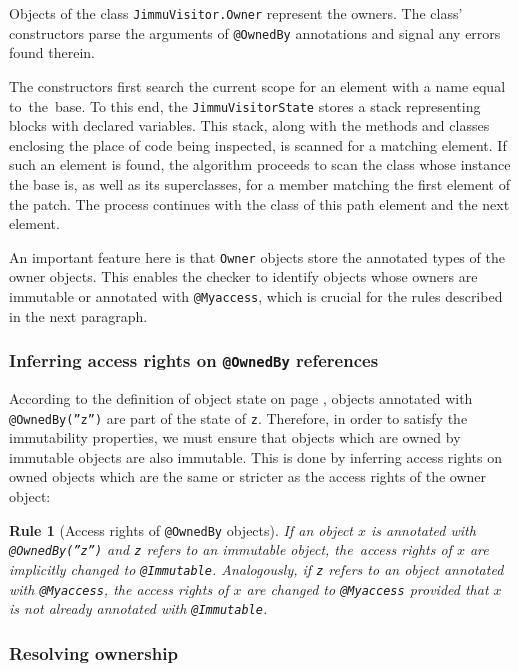 \documentclass{pracamgr}
\theoremstyle{break}
\theoremstyle{break}
\theoremstyle{break}
\newtheorem{verrule}{Rule}
\begin{document}
Objects of the class \texttt{JimmuVisitor.Owner} represent the
owners. The class' constructors parse the arguments of
\texttt{@OwnedBy} annotations and signal any errors found therein.

The constructors first search the current scope for an element with
a name equal to~the~base. To this end, the
\texttt{JimmuVisitorState} stores a stack representing blocks with
declared variables. This stack, along with the methods and classes
enclosing the place of code being inspected, is scanned for a
matching element. If such an element is found, the algorithm proceeds
to scan the class whose instance the base is, as well as its
superclasses, for a member matching the first element of the
patch. The process continues with the class of this path element and
the next element.

An important feature here is that \texttt{Owner} objects store the
annotated types of the owner objects. This enables the checker to
identify objects whose owners are immutable or annotated with
\texttt{@Myaccess}, which is crucial for the rules described in the
next paragraph.

\subsubsection{Inferring access rights on \texttt{@OwnedBy} references} 

According to the definition of object state on page
\pageref{def:state}, objects annotated with \texttt{@OwnedBy(''z'')}
are part of the state of \texttt{z}. Therefore, in order to satisfy
the immutability properties, we must ensure that objects which are
owned by immutable objects are also immutable. This is done by
inferring access rights on owned objects which are the same or
stricter as the access rights of the owner object:

\begin{verrule}[Access rights of \texttt{@OwnedBy} objects]
  If an object $x$ is annotated with \texttt{@OwnedBy(''z'')} and
  \texttt{z} refers to an immutable object, the~access rights of $x$
  are implicitly changed to \texttt{@Immutable}. Analogously, if
  \texttt{z} refers to an object annotated with \texttt{@Myaccess},
  the access rights of $x$ are changed to \texttt{@Myaccess} provided
  that $x$ is not already annotated with \texttt{@Immutable}.
\end{verrule}
\vspace{-0.7cm}

\subsubsection{Resolving ownership} 
\end{document}
